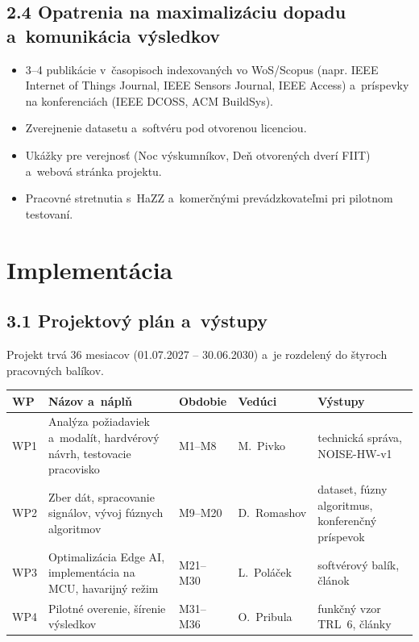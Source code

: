 \documentclass[11pt,a4paper]{article}
\begin{document}
\subsection*{2.4 Opatrenia na maximalizáciu dopadu a~komunikácia výsledkov}
\begin{itemize}
\item 3--4 publikácie v~časopisoch indexovaných vo WoS/Scopus (napr. IEEE Internet of Things Journal, IEEE Sensors Journal, IEEE Access) a~príspevky na konferenciách (IEEE DCOSS, ACM BuildSys).
\item Zverejnenie datasetu a~softvéru pod otvorenou licenciou.
\item Ukážky pre verejnosť (Noc výskumníkov, Deň otvorených dverí FIIT) a~webová stránka projektu.
\item Pracovné stretnutia s~HaZZ a~komerčnými prevádzkovateľmi pri pilotnom testovaní.
\end{itemize}

\section{Implementácia}

\subsection*{3.1 Projektový plán a~výstupy}

Projekt trvá 36 mesiacov (01.07.2027 -- 30.06.2030) a~je rozdelený do štyroch pracovných balíkov.

\begin{center}
\small
\begin{tabularx}{\textwidth}{|p{0.9cm}|L|p{1.8cm}|p{2.2cm}|L|}
\hline
{}\textbf{WP} & \textbf{Názov a~náplň} & \textbf{Obdobie} & \textbf{Vedúci} & \textbf{Výstupy} \\ \hline
WP1 & Analýza požiadaviek a~modalít, hardvérový návrh, testovacie pracovisko & M1--M8 & M.~Pivko & technická správa, NOISE-HW-v1 \\ \hline
WP2 & Zber dát, spracovanie signálov, vývoj fúznych algoritmov & M9--M20 & D.~Romashov & dataset, fúzny algoritmus, konferenčný príspevok \\ \hline
WP3 & Optimalizácia Edge AI, implementácia na MCU, havarijný režim & M21--M30 & L.~Poláček & softvérový balík, článok \\ \hline
WP4 & Pilotné overenie, šírenie výsledkov & M31--M36 & O.~Pribula & funkčný vzor TRL~6, články \\ \hline
\end{tabularx}
\end{center}
\end{document}
